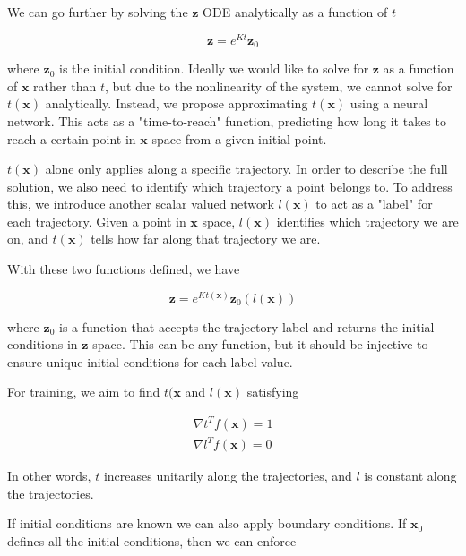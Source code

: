 \documentclass[12pt, letterpaper]{article}
\begin{document}
We can go further by solving the $\mathbf{z}$ ODE analytically as a function of $t$

\begin{equation}
    \mathbf{z} = e^{Kt}\mathbf{z}_0
\end{equation}

where $\mathbf{z}_0$ is the initial condition.  Ideally we would like to solve for $\mathbf{z}$ as a function of $\mathbf{x}$ rather than $t$, but due to the nonlinearity of the system, we cannot solve for $t(\mathbf{x})$ analytically.  Instead, we propose approximating $t(\mathbf{x})$ using a neural network.  This acts as a "time-to-reach" function, predicting how long it takes to reach a certain point in $\mathbf{x}$ space from a given initial point.

$t(\mathbf{x})$ alone only applies along a specific trajectory.  In order to describe the full solution, we also need to identify which trajectory a point belongs to.  To address this, we introduce another scalar valued network $l(\mathbf{x})$ to act as a "label" for each trajectory.  Given a point in $\mathbf{x}$ space, $l(\mathbf{x})$ identifies which trajectory we are on, and $t(\mathbf{x})$ tells how far along that trajectory we are.

With these two functions defined, we have

\begin{equation}
    \mathbf{z} = e^{Kt(\mathbf{x})}\mathbf{z}_0(l(\mathbf{x}))
\end{equation}

where $\mathbf{z}_0$ is a function that accepts the trajectory label and returns the initial conditions in $\mathbf{z}$ space.  This can be any function, but it should be injective to ensure unique initial conditions for each label value.

For training, we aim to find $t(\mathbf{x}$ and $l(\mathbf{x})$ satisfying

\begin{equation}
    \begin{matrix}
        \nabla t^T f(\mathbf{x}) = 1 \\
        \nabla l^T f(\mathbf{x}) = 0
    \end{matrix}
\end{equation}

In other words, $t$ increases unitarily along the trajectories, and $l$ is constant along the trajectories.  

If initial conditions are known we can also apply boundary conditions.  If $\mathbf{x}_0$ defines all the initial conditions, then we can enforce
\end{document}
